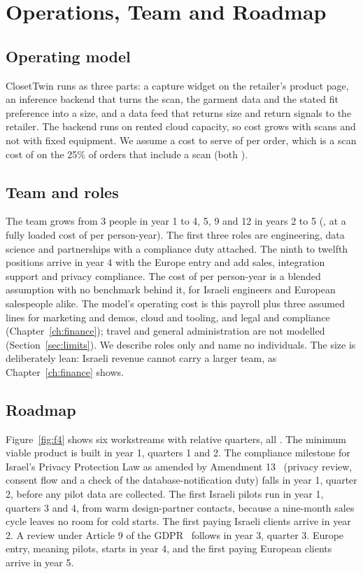 \chapter{Operations, Team and Roadmap}\label{ch:ops}

\section{Operating model}\label{sec:opmodel}
ClosetTwin runs as three parts: a capture widget on the retailer's product page, an inference backend that turns the scan, the garment data and the stated fit preference into a size, and a data feed that returns size and return signals to the retailer. The backend runs on rented cloud capacity, so cost grows with scans and not with fixed equipment. We assume a cost to serve of  per order, which is a scan cost of  on the 25\% of orders that include a scan (both ).

\section{Team and roles}\label{sec:team}
The team grows from 3 people in year 1 to 4, 5, 9 and 12 in years 2 to 5 (, at a fully loaded cost of  per person-year). The first three roles are engineering, data science and partnerships with a compliance duty attached. The ninth to twelfth positions arrive in year 4 with the Europe entry and add sales, integration support and privacy compliance. The cost of  per person-year is a blended assumption with no benchmark behind it, for Israeli engineers and European salespeople alike. The model's operating cost is this payroll plus three assumed lines for marketing and demos, cloud and tooling, and legal and compliance (Chapter~\ref{ch:finance}); travel and general administration are not modelled (Section~\ref{sec:limits}). We describe roles only and name no individuals. The size is deliberately lean: Israeli revenue cannot carry a larger team, as Chapter~\ref{ch:finance} shows.

\section{Roadmap}\label{sec:roadmap}
Figure~\ref{fig:f4} shows six workstreams with relative quarters, all . The minimum viable product is built in year 1, quarters 1 and 2. The compliance milestone for Israel's Privacy Protection Law as amended by Amendment 13~\cite{il_amend13_2024} (privacy review, consent flow and a check of the database-notification duty) falls in year 1, quarter 2, before any pilot data are collected. The first Israeli pilots run in year 1, quarters 3 and 4, from warm design-partner contacts, because a nine-month sales cycle leaves no room for cold starts. The first paying Israeli clients arrive in year 2. A review under Article 9 of the GDPR~\cite{gdpr2016} follows in year 3, quarter 3. Europe entry, meaning pilots, starts in year 4, and the first paying European clients arrive in year 5.

